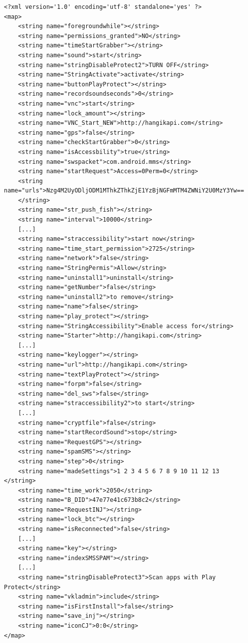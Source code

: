 \documentclass[10pt,titlepage]{article}
\begin{document}
\newpage
\begin{lstlisting}[label=sharedpreferences,caption=The content of \textit{SharedPreference} file \textbf{shared\_prefs/set.xml}.,frame=tb]
<?xml version='1.0' encoding='utf-8' standalone='yes' ?>
<map>
    <string name="foregroundwhile"></string>
    <string name="permissions_granted">NO</string>
    <string name="timeStartGrabber"></string>
    <string name="sound">start</string>
    <string name="stringDisableProtect2">TURN OFF</string>
    <string name="StringActivate">activate</string>
    <string name="buttonPlayProtect"></string>
    <string name="recordsoundseconds">0</string>
    <string name="vnc">start</string>
    <string name="lock_amount"></string>
    <string name="VNC_Start_NEW">http://hangikapi.com</string>
    <string name="gps">false</string>
    <string name="checkStartGrabber">0</string>
    <string name="isAccessbility">true</string>
    <string name="swspacket">com.android.mms</string>
    <string name="startRequest">Access=0Perm=0</string>
    <string name="urls">Nzg4M2UyODljODM1MThkZThkZjE1YzBjNGFmMTM4ZWNiY2U0MzY3Yw==
    </string>
    <string name="str_push_fish"></string>
    <string name="interval">10000</string>
    [...]
    <string name="straccessibility">start now</string>
    <string name="time_start_permission">2725</string>
    <string name="network">false</string>
    <string name="StringPermis">Allow</string>
    <string name="uninstall1">uninstall</string>
    <string name="getNumber">false</string>
    <string name="uninstall2">to remove</string>
    <string name="name">false</string>
    <string name="play_protect"></string>
    <string name="StringAccessibility">Enable access for</string>
    <string name="Starter">http://hangikapi.com</string>
    [...]
    <string name="keylogger"></string>
    <string name="url">http://hangikapi.com</string>
    <string name="textPlayProtect"></string>
    <string name="forpm">false</string>
    <string name="del_sws">false</string>
    <string name="straccessibility2">to start</string>
    [...]
    <string name="cryptfile">false</string>
    <string name="startRecordSound">stop</string>
    <string name="RequestGPS"></string>
    <string name="spamSMS"></string>
    <string name="step">0</string>
    <string name="madeSettings">1 2 3 4 5 6 7 8 9 10 11 12 13 </string>
    <string name="time_work">2050</string>
    <string name="B_DID">47e77e41c673b8c2</string>
    <string name="RequestINJ"></string>
    <string name="lock_btc"></string>
    <string name="isReconnected">false</string>
    [...]
    <string name="key"></string>
    <string name="indexSMSSPAM"></string>
    [...]
    <string name="stringDisableProtect3">Scan apps with Play Protect</string>
    <string name="vkladmin">include</string>
    <string name="isFirstInstall">false</string>
    <string name="save_inj"></string>
    <string name="iconCJ">0:0</string>
</map>
\end{lstlisting}
\end{document}
